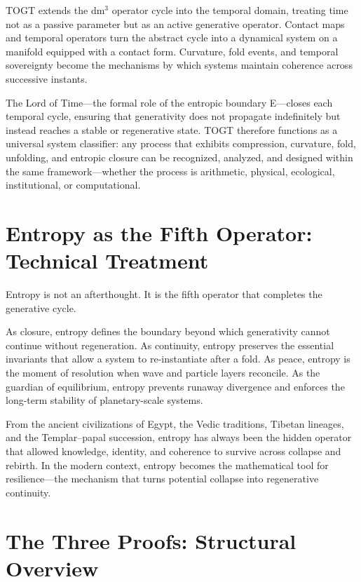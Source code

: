 \documentclass[14pt, twoside, openright]{book}
\theoremstyle{definition}
\theoremstyle{remark}
\begin{document}
TOGT extends the dm$^{3}$ operator cycle into the temporal domain, treating time
not as a passive parameter but as an active generative operator. Contact maps
and temporal operators turn the abstract cycle into a dynamical system on a
manifold equipped with a contact form. Curvature, fold events, and temporal
sovereignty become the mechanisms by which systems maintain coherence across
successive instants.

The Lord of Time---the formal role of the entropic boundary E---closes each
temporal cycle, ensuring that generativity does not propagate indefinitely but
instead reaches a stable or regenerative state. TOGT therefore functions as a
universal system classifier: any process that exhibits compression, curvature,
fold, unfolding, and entropic closure can be recognized, analyzed, and designed
within the same framework---whether the process is arithmetic, physical,
ecological, institutional, or computational.

\chapter{Entropy as the Fifth Operator: Technical Treatment}

Entropy is not an afterthought. It is the fifth operator that completes the
generative cycle.

As closure, entropy defines the boundary beyond which generativity cannot continue
without regeneration. As continuity, entropy preserves the essential invariants
that allow a system to re-instantiate after a fold. As peace, entropy is the
moment of resolution when wave and particle layers reconcile. As the guardian of
equilibrium, entropy prevents runaway divergence and enforces the long-term
stability of planetary-scale systems.

From the ancient civilizations of Egypt, the Vedic traditions, Tibetan lineages,
and the Templar--papal succession, entropy has always been the hidden operator
that allowed knowledge, identity, and coherence to survive across collapse and
rebirth. In the modern context, entropy becomes the mathematical tool for
resilience---the mechanism that turns potential collapse into regenerative
continuity.

\chapter{The Three Proofs: Structural Overview}
\end{document}
